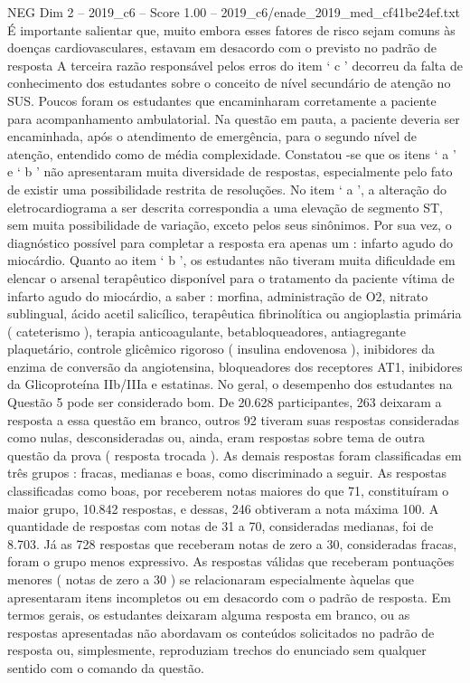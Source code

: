 \begin{textsample}{NEG Dim 2 – 2019\_c6 – Score 1.00 – 2019\_c6/enade\_2019\_med\_cf41be24ef.txt}
É importante salientar que, muito embora esses fatores de risco sejam comuns às doenças cardiovasculares, estavam em desacordo com o previsto no padrão de resposta A terceira razão responsável pelos erros do item ‘ c ’ decorreu da falta de conhecimento dos estudantes sobre o conceito de nível secundário de atenção no SUS.
Poucos foram os estudantes que encaminharam corretamente a paciente para acompanhamento ambulatorial.
Na questão em pauta, a paciente deveria ser encaminhada, após o atendimento de emergência, para o segundo nível de atenção, entendido como de média complexidade.
Constatou -se que os itens ‘ a ’ e ‘ b ’ não apresentaram muita diversidade de respostas, especialmente pelo fato de existir uma possibilidade restrita de resoluções.
No item ‘ a ’, a alteração do eletrocardiograma a ser descrita correspondia a uma elevação de segmento ST, sem muita possibilidade de variação, exceto pelos seus sinônimos.
Por sua vez, o diagnóstico possível para completar a resposta era apenas um : infarto agudo do miocárdio.
Quanto ao item ‘ b ’, os estudantes não tiveram muita dificuldade em elencar o arsenal terapêutico disponível para o tratamento da paciente vítima de infarto agudo do miocárdio, a saber : morfina, administração de O2, nitrato sublingual, ácido acetil salicílico, terapêutica fibrinolítica ou angioplastia primária ( cateterismo ), terapia anticoagulante, betabloqueadores, antiagregante plaquetário, controle glicêmico rigoroso ( insulina endovenosa ), inibidores da enzima de conversão da angiotensina, bloqueadores dos receptores AT1, inibidores da Glicoproteína IIb/IIIa e estatinas.
No geral, o desempenho dos estudantes na Questão 5 pode ser considerado bom.
De 20.628 participantes, 263 deixaram a resposta a essa questão em branco, outros 92 tiveram suas respostas consideradas como nulas, desconsideradas ou, ainda, eram respostas sobre tema de outra questão da prova ( resposta trocada ).
As demais respostas foram classificadas em três grupos : fracas, medianas e boas, como discriminado a seguir.
As respostas classificadas como boas, por receberem notas maiores do que 71, constituíram o maior grupo, 10.842 respostas, e dessas, 246 obtiveram a nota máxima 100.
A quantidade de respostas com notas de 31 a 70, consideradas medianas, foi de 8.703.
Já as 728 respostas que receberam notas de zero a 30, consideradas fracas, foram o grupo menos expressivo.
As respostas válidas que receberam pontuações menores ( notas de zero a 30 ) se relacionaram especialmente àquelas que apresentaram itens incompletos ou em desacordo com o padrão de resposta.
Em termos gerais, os estudantes deixaram alguma resposta em branco, ou as respostas apresentadas não abordavam os conteúdos solicitados no padrão de resposta ou, simplesmente, reproduziam trechos do enunciado sem qualquer sentido com o comando da questão.

\end{textsample}
